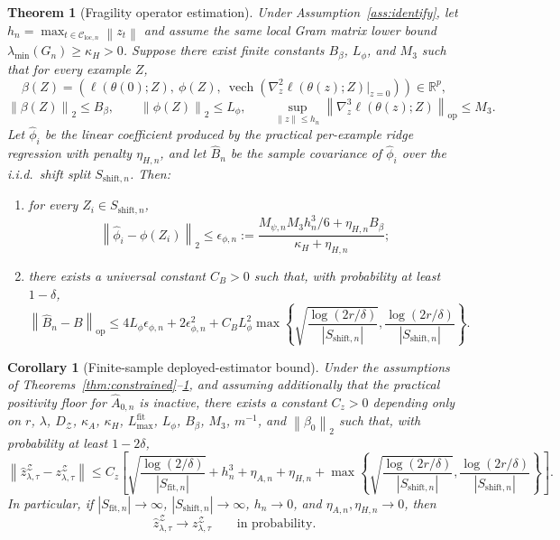 \documentclass{article}
\newtheorem{theorem}{Theorem}
\newtheorem{corollary}{Corollary}
\newcommand{\RR}{\mathbb{R}}
\newcommand{\cC}{\mathcal{C}}
\newcommand{\cZ}{\mathcal{Z}}
\newcommand{\loss}{\ell}
\newcommand{\norm}[1]{\left\lVert #1 \right\rVert}
\newcommand{\abs}[1]{\left\lvert #1 \right\rvert}
\newcommand{\paren}[1]{\left( #1 \right)}
\newcommand{\bracks}[1]{\left[ #1 \right]}
\newcommand{\braces}[1]{\left\{ #1 \right\}}
\begin{document}
\begin{theorem}[Fragility operator estimation]
\label{thm:B_est}
Under Assumption~\ref{ass:identify}, let \(h_n=\max_{t\in\cC_{\mathrm{loc},n}} \norm{z_t}\) and assume the same local Gram matrix lower bound \(\lambda_{\min}(G_n)\ge \kappa_H>0\). Suppose there exist finite constants \(B_\beta\), \(L_\phi\), and \(M_3\) such that for every example \(Z\),
\[
\beta(Z)=\paren{\loss(\theta(0);Z),\ \phi(Z),\ \operatorname{vech}\!\paren{\nabla_z^2 \loss(\theta(z);Z)\vert_{z=0}}}
\in \RR^p,
\]
\[
\norm{\beta(Z)}_2 \le B_\beta,
\qquad
\norm{\phi(Z)}_2 \le L_\phi,
\qquad
\sup_{\norm{z}\le h_n} \norm{\nabla_z^3 \loss(\theta(z);Z)}_{\mathrm{op}} \le M_3.
\]
Let \(\hat\phi_i\) be the linear coefficient produced by the practical per-example ridge regression with penalty \(\eta_{H,n}\), and let \(\hat B_n\) be the sample covariance of \(\hat\phi_i\) over the i.i.d.\ shift split \(S_{\mathrm{shift},n}\). Then:
\begin{enumerate}[leftmargin=1.4em]
    \item for every \(Z_i\in S_{\mathrm{shift},n}\),
    \[
    \norm{\hat\phi_i - \phi(Z_i)}_2
    \le
    \epsilon_{\phi,n}
    :=
    \frac{M_{\psi,n} M_3 h_n^3/6 + \eta_{H,n} B_\beta}{\kappa_H+\eta_{H,n}};
    \]
    \item there exists a universal constant \(C_B>0\) such that, with probability at least \(1-\delta\),
    \[
    \norm{\hat B_n - B}_{\mathrm{op}}
    \le
    4L_\phi \epsilon_{\phi,n} + 2\epsilon_{\phi,n}^2
    +
    C_B L_\phi^2
    \max\braces{
    \sqrt{\frac{\log(2r/\delta)}{\abs{S_{\mathrm{shift},n}}}},
    \frac{\log(2r/\delta)}{\abs{S_{\mathrm{shift},n}}}
    }.
    \]
\end{enumerate}
\end{theorem}

\begin{corollary}[Finite-sample deployed-estimator bound]
\label{cor:finite_sample}
Under the assumptions of Theorems~\ref{thm:constrained}--\ref{thm:B_est}, and assuming additionally that the practical positivity floor for \(\hat A_{0,n}\) is inactive, there exists a constant \(C_z>0\) depending only on \(r\), \(\lambda\), \(D_\cZ\), \(\kappa_A\), \(\kappa_H\), \(L_{\max}^{\mathrm{fit}}\), \(L_\phi\), \(B_\beta\), \(M_3\), \(m^{-1}\), and \(\norm{\beta_0}_2\) such that, with probability at least \(1-2\delta\),
\[
\norm{\hat z_{\lambda,\tau}^{\cZ} - z_{\lambda,\tau}^{\cZ}}
\le
C_z
\bracks{
\sqrt{\frac{\log(2/\delta)}{\abs{S_{\mathrm{fit},n}}}}
+
h_n^3
+
\eta_{A,n}
+
\eta_{H,n}
+
\max\braces{
\sqrt{\frac{\log(2r/\delta)}{\abs{S_{\mathrm{shift},n}}}},
\frac{\log(2r/\delta)}{\abs{S_{\mathrm{shift},n}}}
}
}.
\]
In particular, if \(\abs{S_{\mathrm{fit},n}}\to\infty\), \(\abs{S_{\mathrm{shift},n}}\to\infty\), \(h_n\to 0\), and \(\eta_{A,n},\eta_{H,n}\to 0\), then
\[
\hat z_{\lambda,\tau}^{\cZ} \to z_{\lambda,\tau}^{\cZ}
\qquad
\text{in probability}.
\]
\end{corollary}
\end{document}
